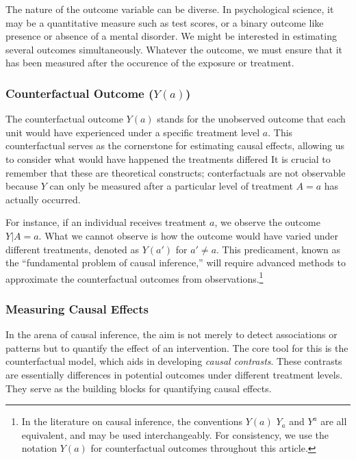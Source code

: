 \documentclass[
  singlecolumn]{article}
\begin{document}
The nature of the outcome variable can be diverse. In psychological
science, it may be a quantitative measure such as test scores, or a
binary outcome like presence or absence of a mental disorder. We might
be interested in estimating several outcomes simultaneously. Whatever
the outcome, we must ensure that it has been measured after the
occurence of the exposure or treatment.

\subsubsection{\texorpdfstring{Counterfactual Outcome
(\(Y(a)\))}{Counterfactual Outcome (Y(a))}}\label{counterfactual-outcome-ya}

The counterfactual outcome \(Y(a)\) stands for the unobserved outcome
that each unit would have experienced under a specific treatment level
\(a\). This counterfactual serves as the cornerstone for estimating
causal effects, allowing us to consider what would have happened the
treatments differed It is crucial to remember that these are theoretical
constructs; conterfactuals are not observable because \(Y\) can only be
measured after a particular level of treatment \(A=a\) has actually
occurred.

For instance, if an individual receives treatment \(a\), we observe the
outcome \(Y|A=a\). What we cannot observe is how the outcome would have
varied under different treatments, denoted as \(Y(a')\) for
\(a' \neq a\). This predicament, known as the ``fundamental problem of
causal inference,'' will require advanced methods to approximate the
counterfactual outcomes from observations.\footnote{In the literature on
  causal inference, the conventions \(Y(a)\) \(Y_a\) and \(Y^a\) are all
  equivalent, and may be used interchangeably. For consistency, we use
  the notation \(Y(a)\) for counterfactual outcomes throughout this
  article.}

\subsubsection{Measuring Causal Effects}\label{measuring-causal-effects}

In the arena of causal inference, the aim is not merely to detect
associations or patterns but to quantify the effect of an intervention.
The core tool for this is the counterfactual model, which aids in
developing \emph{causal contrasts}. These contrasts are essentially
differences in potential outcomes under different treatment levels. They
serve as the building blocks for quantifying causal effects.
\end{document}

